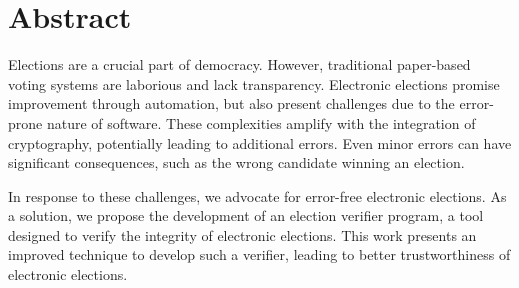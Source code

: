 \chapter*{Abstract}
Elections are a crucial part of democracy. However, traditional paper-based voting systems are laborious and lack transparency. Electronic elections promise improvement through automation, but also present challenges due to the error-prone nature of software. These complexities amplify with the integration of cryptography, potentially leading to additional errors. Even minor errors can have significant consequences, such as the wrong candidate winning an election.

In response to these challenges, we advocate for error-free electronic elections. As a solution, we propose the development of an election verifier program, a tool designed to verify the integrity of electronic elections. This work presents an improved technique to develop such a verifier, leading to better trustworthiness of electronic elections.